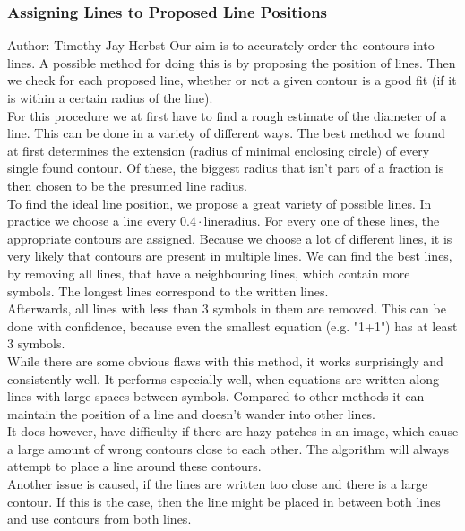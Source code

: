 \documentclass[12pt]{article}
\begin{document}
	\subsubsection{Assigning Lines to Proposed Line Positions}
	\small{Author: Timothy Jay Herbst} \newline \newline
	Our aim is to accurately order the contours into lines.
	A possible method for doing this is by proposing the position of lines.
	Then we check for each proposed line, whether or not a given contour is a good fit (if it is within a certain radius of the line).\\
	For this procedure we at first have to find a rough estimate of the diameter of a line.
	This can be done in a variety of different ways.
	The best method we found at first determines the extension (radius of minimal enclosing circle) of every single found contour.
	Of these, the biggest radius that isn't part of a fraction is then chosen to be the presumed line radius.\\
	To find the ideal line position, we propose a great variety of possible lines.
	In practice we choose a line every $0.4 \cdot \mathrm{line radius}$.
	For every one of these lines, the appropriate contours are assigned.
	Because we choose a lot of different lines, it is very likely that contours are present in multiple lines.
	We can find the best lines, by removing all lines, that have a neighbouring lines, which contain more symbols.
	The longest lines correspond to the written lines.\\
	Afterwards, all lines with less than 3 symbols in them are removed.
	This can be done with confidence, because even the smallest equation (e.g. "1+1") has at least 3 symbols.\\
	
	While there are some obvious flaws with this method, it works surprisingly and consistently well.
	It performs especially well, when equations are written along lines with large spaces between symbols.
	Compared to other methods it can maintain the position of a line and doesn't wander into other lines.\\
	It does however, have difficulty if there are hazy patches in an image, which cause a large amount of wrong contours close to each other.
	The algorithm will always attempt to place a line around these contours.\\
	Another issue is caused, if the lines are written too close and there is a large contour.
	If this is the case, then the line might be placed in between both lines and use contours from both lines.
	
\end{document}

